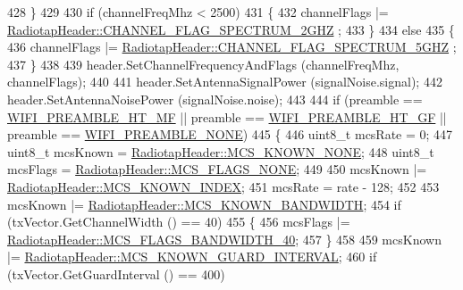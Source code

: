 \begin{DoxyCode}
428           \}
429 
430         \textcolor{keywordflow}{if} (channelFreqMhz < 2500)
431           \{
432             channelFlags |= \hyperlink{classns3_1_1RadiotapHeader_a26df5fbb86499c692bd97a99781c8140ad68676f7619fa54f09340cd1f4f72ce6}{RadiotapHeader::CHANNEL\_FLAG\_SPECTRUM\_2GHZ}
      ;
433           \}
434         \textcolor{keywordflow}{else}
435           \{
436             channelFlags |= \hyperlink{classns3_1_1RadiotapHeader_a26df5fbb86499c692bd97a99781c8140acfb568bbac292324781feea8775ea1a1}{RadiotapHeader::CHANNEL\_FLAG\_SPECTRUM\_5GHZ}
      ;
437           \}
438 
439         header.SetChannelFrequencyAndFlags (channelFreqMhz, channelFlags);
440 
441         header.SetAntennaSignalPower (signalNoise.signal);
442         header.SetAntennaNoisePower (signalNoise.noise);
443 
444         \textcolor{keywordflow}{if} (preamble == \hyperlink{group__wifi_gga5e94a56cb338a14ffbbb19c6a41251ebae0944a664debb28943c12d4cd7a81d2a}{WIFI\_PREAMBLE\_HT\_MF} || preamble == 
      \hyperlink{group__wifi_gga5e94a56cb338a14ffbbb19c6a41251eba82e0b00d79c1f01b7a6e46b693bafd72}{WIFI\_PREAMBLE\_HT\_GF} || preamble == \hyperlink{group__wifi_gga5e94a56cb338a14ffbbb19c6a41251eba97c5c71995de5f28931200e6d5a38a66}{WIFI\_PREAMBLE\_NONE})
445           \{
446             uint8\_t mcsRate = 0;
447             uint8\_t mcsKnown = \hyperlink{classns3_1_1RadiotapHeader_aac7ef91c429fa95640a0e3a996b6741da5f2972d03b27b90f0dbdc5a903e2decc}{RadiotapHeader::MCS\_KNOWN\_NONE};
448             uint8\_t mcsFlags = \hyperlink{classns3_1_1RadiotapHeader_a81a58a7c4281df7ce21fb72c5ed181c3a67178ec6513d916afcecb853ff28879a}{RadiotapHeader::MCS\_FLAGS\_NONE};
449 
450             mcsKnown |= \hyperlink{classns3_1_1RadiotapHeader_aac7ef91c429fa95640a0e3a996b6741daab8509a5cfee677782d45ad3bca2cac2}{RadiotapHeader::MCS\_KNOWN\_INDEX};
451             mcsRate = rate - 128;
452 
453             mcsKnown |= \hyperlink{classns3_1_1RadiotapHeader_aac7ef91c429fa95640a0e3a996b6741da7bbfbd0cfea7cfe806ec9dee40c8565b}{RadiotapHeader::MCS\_KNOWN\_BANDWIDTH};
454             \textcolor{keywordflow}{if} (txVector.GetChannelWidth () == 40)
455               \{
456                 mcsFlags |= \hyperlink{classns3_1_1RadiotapHeader_a81a58a7c4281df7ce21fb72c5ed181c3ab773f6bda0fb799641002df6fa7999b3}{RadiotapHeader::MCS\_FLAGS\_BANDWIDTH\_40};
457               \}
458 
459             mcsKnown |= \hyperlink{classns3_1_1RadiotapHeader_aac7ef91c429fa95640a0e3a996b6741da5dbf7e5fad03d398c6e4e0c349052c6c}{RadiotapHeader::MCS\_KNOWN\_GUARD\_INTERVAL};
460             \textcolor{keywordflow}{if} (txVector.GetGuardInterval () == 400)

\end{DoxyCode}
